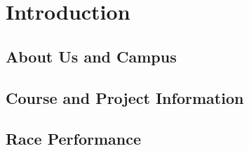\section{Introduction}

\subsection{About Us and Campus}

\subsection{Course and Project Information}

\subsection{Race Performance}
